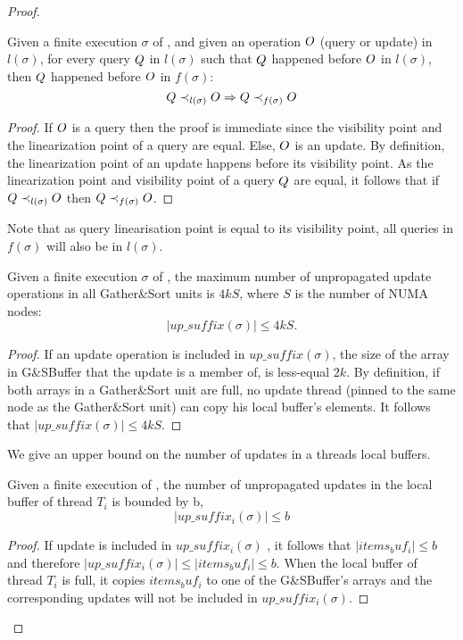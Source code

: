 \begin{proof}
\begin{lemma}\label{Lem: op_order}
Given a finite execution $\sigma$ of \mysketch, and given an operation $\mathnormal{O}$ (query or update) in $l(\sigma)$, for every query $\mathnormal{Q}$ in $l(\sigma)$ such that $\mathnormal{Q}$ happened before $\mathnormal{O}$ in \(l(\sigma)\), then $\mathnormal{Q}$ happened before $\mathnormal{O}$ in \(f(\sigma)\):  \[\mathnormal{Q} \prec_{l(\sigma)}\mathnormal{O} \Rightarrow  \mathnormal{Q} \prec_{f(\sigma)} \mathnormal{O}\]
\end{lemma}
\begin{proof}
If $\mathnormal{O}$ is a query then the proof is immediate since the visibility point and the linearization point of a query are equal. Else, $\mathnormal{O}$ is an update. By definition, the linearization point of an update happens before its visibility point. As the linearization point and visibility point of a query $\mathnormal{Q}$ are equal, it follows that if \(\mathnormal{Q} \prec_{l(\sigma)} \mathnormal{O}\) then \(\mathnormal{Q} \prec_{f(\sigma)} \mathnormal{O}\).
\end{proof}

Note that as query linearisation point is equal to its visibility point, all queries in $f(\sigma)$ will also be in $l(\sigma)$. 

\begin{lemma}\label{Lem: GSBuffer_updates_num}
Given a finite execution $\sigma$ of \mysketch, the maximum number of unpropagated update operations in all Gather\&Sort units is \(4kS\), where $S$ is the number of NUMA nodes: \[|\mathit{up\_suffix}(\sigma)| \leq 4kS.\]
\end{lemma}
\begin{proof}
If an update operation is included in \(\mathit{up\_suffix}(\sigma)\), the size of the array in G\&SBuffer that the update is a member of, is less-equal $2k$. By definition, if both arrays in a Gather\&Sort unit are full, no update thread (pinned to the same node as the Gather\&Sort unit) can copy his local buffer's elements. It follows that \(|\mathit{up\_suffix}(\sigma)| \leq 4kS\).
\end{proof}

We give an upper bound on the number of updates in a threads local buffers.

\begin{lemma}\label{Lem: local_updates_num}
Given a finite execution \s of \mysketch, the number of unpropagated updates in the local buffer of thread \(T_i\) is bounded by b, \[|up\_suffix_i(\sigma)| \leq b\]
\end{lemma}
\begin{proof}
If update is included in \(up\_suffix_i(\sigma)\) , it follows that \(|items_buf_i| \leq b\) and therefore \(|up\_suffix_i(\sigma)| \leq |items_buf_i| \leq b \). When the local buffer of thread \(T_i\) is full, it copies \(items_buf_i\) to one of the G\&SBuffer's arrays and the corresponding updates will not be included in \(up\_suffix_i(\sigma)\).
\end{proof}


\end{proof}
